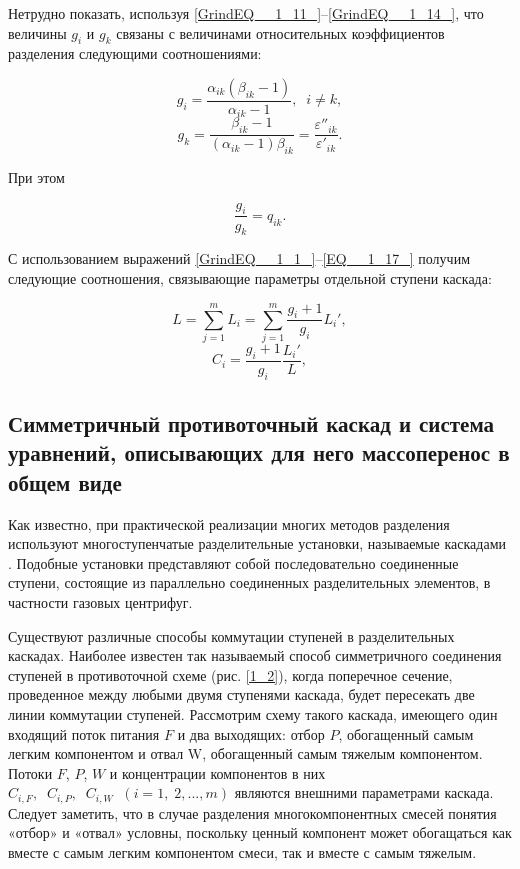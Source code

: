 Нетрудно показать, используя \ref{GrindEQ__1_11_}--\ref{GrindEQ__1_14_}, что величины $g_{i}$ и $g_{k}$  связаны с величинами относительных коэффициентов разделения следующими соотношениями:

\begin{equation} \label{EQ__1_15_} 
  g_{i} =\frac{\alpha _{ik} (\beta _{ik} -1)}{\alpha _{ik} -1} ,\; \; i\ne k,           
  \end{equation} 
  \begin{equation} \label{EQ__1_16_} 
  g_{k} =\frac{\beta _{ik} -1}{(\alpha _{ik} -1)\beta _{ik} } =\frac{\varepsilon ''_{ik} }{\varepsilon '_{ik} } . 
\end{equation} 

При этом

\begin{equation} \label{EQ__1_17_} 
  \frac{g_{i} }{g_{k} } =q_{ik} .           
\end{equation} 

С использованием выражений \ref{GrindEQ__1_1_}--\ref{EQ__1_17_} получим следующие соотношения, связывающие параметры отдельной ступени каскада:

\begin{equation} \label{GrindEQ__1_18_} 
  L=\sum _{j=1}^{m}L_{i}  =\sum _{j=1}^{m}\frac{g_{i} +1}{g_{i} }  L_{i} ',               
  \end{equation} 
  \begin{equation} \label{GrindEQ__1_19_} 
  C_{i} =\frac{g_{i} +1}{g_{i} } \frac{L_{i} '}{L} ,         
  \end{equation} 
  

\subsection{Симметричный противоточный каскад и система уравнений, описывающих для него массоперенос в общем виде}

Как известно, при практической реализации многих методов разделения используют многоступенчатые разделительные установки, называемые каскадами \cite{sulaberidzeTeoriyaKaskadovDlya2011}. Подобные установки представляют собой последовательно соединенные ступени, состоящие из параллельно соединенных разделительных элементов, в частности газовых центрифуг.

Существуют различные способы коммутации ступеней в разделительных каскадах. Наиболее известен так называемый способ симметричного соединения ступеней в противоточной схеме (рис. \ref{1_2}), когда поперечное сечение, проведенное между любыми двумя ступенями каскада, будет пересекать две линии коммутации ступеней. Рассмотрим схему такого каскада, имеющего один входящий поток питания $F$ и два выходящих: отбор $P$, обогащенный самым легким компонентом и отвал W, обогащенный самым тяжелым компонентом. Потоки $F$, $P$, $W$ и концентрации компонентов в них $C_{i,F} ,\; \; C_{i,P} ,\; \; C_{i,W} \; \; (i=1,\; 2,...,m)$ являются внешними параметрами каскада. Следует заметить, что в случае разделения многокомпонентных смесей понятия «отбор» и «отвал» условны, поскольку ценный компонент может обогащаться как вместе с самым легким компонентом смеси, так и вместе с самым тяжелым.

